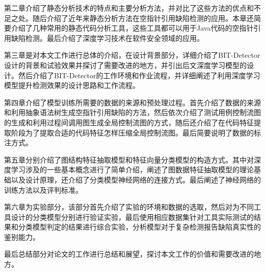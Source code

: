 第二章介绍了静态分析技术的特点和主要分析方法，并对比了这些方法的优点和不足之处。随后介绍了近年来静态分析方法在空指针引用缺陷检测的应用。本章还简要介绍了几种常用的静态代码分析工具，这些工具都可以用于Java代码的空指针引用缺陷检测。最后介绍了深度学习技术在软件安全领域的应用。

第三章是对本文工作进行总体的介绍，在设计背景部分，详细介绍了BIT-Detector设计的背景和试验效果并探讨了需要改进的地方，并引出后文深度学习模型的设计。然后介绍了BIT-Detector的工作环境和作业流程，并详细阐述了利用深度学习模型提升检测效果的设计思路和工作流程。

第四章介绍了模型训练所需要的数据的来源和预处理过程。首先介绍了数据的来源和利用抽象语法树生成空指针引用缺陷的方法，然后依次介绍了测试用例控制流图的生成和利用过程间调用图生成全局控制流图的方式，随后还介绍了在代码特征提取阶段为了提取合适的代码特征怎样压缩全局控制流图。最后简要说明了数据的标注方式。

第五章分别介绍了图结构特征抽取模型和特征向量分类模型的构造方式。其中对深度学习涉及的一些基本概念进行了简单介绍，阐述了图数据特征抽取模型的理论基础以及设计原理，还介绍了分类模型神经网络的连接方式。最后阐述了神经网络的训练方法以及评判标准。 

第六章为实验部分，该部分首先介绍了实验的环境和数据的选取，然后对为不同工具设计的分类模型分别进行验证实验，最后使用相应数据集针对工具实际测试的结果和分类模型判定的结果进行综合实验，分析模型对于复杂检测报告缺陷真实性的鉴别能力。

最后总结部分对论文的工作进行总结和展望，探讨本文工作的价值和需要改进的地方。





